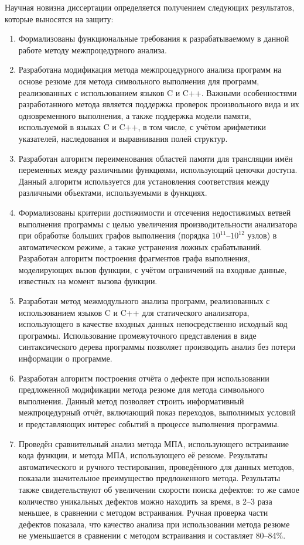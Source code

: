 Научная новизна диссертации определяется получением следующих результатов, которые выносятся на защиту:
\begin{enumerate}[leftmargin=1em]
  \item Формализованы функциональные требования к разрабатываемому в данной работе методу межпроцедурного анализа.
  \item Разработана модификация метода межпроцедурного анализа программ на основе резюме для метода символьного выполнения для программ, реализованных с использованием языков C и C++. Важными особенностями разработанного метода является поддержка проверок произвольного вида и их одновременного выполнения, а также поддержка модели памяти, используемой в языках C и C++, в том числе, с учётом арифметики указателей, наследования и выравнивания полей структур.
  \item Разработан алгоритм переименования областей памяти для трансляции имён переменных между различными функциями, использующий цепочки доступа. Данный алгоритм используется для установления соответствия между различными объектами, используемыми в функциях.
  \item Формализованы критерии достижимости и отсечения недостижимых ветвей выполнения программы с целью увеличения производительности анализатора при обработке больших графов выполнения (порядка $10^{11}$--$10^{12}$ узлов) в автоматическом режиме, а также устранения ложных срабатываний. Разработан алгоритм построения фрагментов графа выполнения, моделирующих вызов функции, с учётом ограничений на входные данные, известных на момент вызова функции. 
  \item Разработан метод межмодульного анализа программ, реализованных с использованием языков C и C++ для статического анализатора, использующего в качестве входных данных непосредственно исходный код программы. Использование промежуточного представления в виде синтаксического дерева программы позволяет производить анализ без потери информации о программе.
  \item Разработан алгоритм построения отчёта о дефекте при использовании предложенной модификации метода резюме для метода символьного выполнения. Данный метод позволяет строить информативный межпроцедурный отчёт, включающий показ переходов, выполнимых условий и представляющих интерес событий в процессе выполнения программы.
  \item Проведён сравнительный анализ метода МПА, использующего встраивание кода функции, и метода МПА, использующего её резюме. Результаты автоматического и ручного тестирования, проведённого для данных методов, показали значительное преимущество предложенного метода. Результаты также свидетельствуют об увеличении скорости поиска дефектов: то же самое количество уникальных дефектов можно находить за время, в 2--3 раза меньшее, в сравнении с методом встраивания. Ручная проверка части дефектов показала, что качество анализа при использовании метода резюме не уменьшается в сравнении с методом встраивания и составляет 80--84\%.


\end{enumerate}

